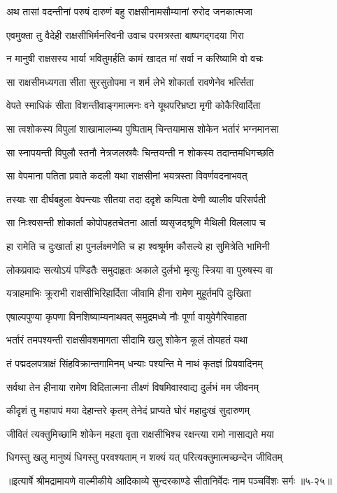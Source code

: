 
\twolineshloka
{अथ तासां वदन्तीनां परुषं दारुणं बहु}
{राक्षसीनामसौम्यानां रुरोद जनकात्मजा} %

\twolineshloka
{एवमुक्ता तु वैदेही राक्षसीभिर्मनस्विनी}
{उवाच परमत्रस्ता बाष्पगद्गदया गिरा} %

\twolineshloka
{न मानुषी राक्षसस्य भार्या भवितुमर्हति}
{कामं खादत मां सर्वा न करिष्यामि वो वचः} %

\twolineshloka
{सा राक्षसीमध्यगता सीता सुरसुतोपमा}
{न शर्म लेभे शोकार्ता रावणेनेव भर्त्सिता} %

\twolineshloka
{वेपते स्माधिकं सीता विशन्तीवाङ्गमात्मनः}
{वने यूथपरिभ्रष्टा मृगी कोकैरिवार्दिता} %

\twolineshloka
{सा त्वशोकस्य विपुलां शाखामालम्ब्य पुष्पिताम्}
{चिन्तयामास शोकेन भर्तारं भग्नमानसा} %

\twolineshloka
{सा स्नापयन्ती विपुलौ स्तनौ नेत्रजलस्रवैः}
{चिन्तयन्ती न शोकस्य तदान्तमधिगच्छति} %

\twolineshloka
{सा वेपमाना पतिता प्रवाते कदली यथा}
{राक्षसीनां भयत्रस्ता विवर्णवदनाभवत्} %

\twolineshloka
{तस्याः सा दीर्घबहुला वेपन्त्याः सीतया तदा}
{ददृशे कम्पिता वेणी व्यालीव परिसर्पती} %

\twolineshloka
{सा निःश्वसन्ती शोकार्ता कोपोपहतचेतना}
{आर्ता व्यसृजदश्रूणि मैथिली विललाप च} %

\twolineshloka
{हा रामेति च दुःखार्ता हा पुनर्लक्ष्मणेति च}
{हा श्वश्रूर्मम कौसल्ये हा सुमित्रेति भामिनी} %

\twolineshloka
{लोकप्रवादः सत्योऽयं पण्डितैः समुदाहृतः}
{अकाले दुर्लभो मृत्युः स्त्रिया वा पुरुषस्य वा} %

\twolineshloka
{यत्राहमाभिः क्रूराभी राक्षसीभिरिहार्दिता}
{जीवामि हीना रामेण मुहूर्तमपि दुःखिता} %

\twolineshloka
{एषाल्पपुण्या कृपणा विनशिष्याम्यनाथवत्}
{समुद्रमध्ये नौः पूर्णा वायुवेगैरिवाहता} %

\twolineshloka
{भर्तारं तमपश्यन्ती राक्षसीवशमागता}
{सीदामि खलु शोकेन कूलं तोयहतं यथा} %

\twolineshloka
{तं पद्मदलपत्राक्षं सिंहविक्रान्तगामिनम्}
{धन्याः पश्यन्ति मे नाथं कृतज्ञं प्रियवादिनम्} %

\twolineshloka
{सर्वथा तेन हीनाया रामेण विदितात्मना}
{तीक्ष्णं विषमिवास्वाद्य दुर्लभं मम जीवनम्} %

\twolineshloka
{कीदृशं तु महापापं मया देहान्तरे कृतम्}
{तेनेदं प्राप्यते घोरं महादुःखं सुदारुणम्} %

\twolineshloka
{जीवितं त्यक्तुमिच्छामि शोकेन महता वृता}
{राक्षसीभिश्च रक्षन्त्या रामो नासाद्यते मया} %

\twolineshloka
{धिगस्तु खलु मानुष्यं धिगस्तु परवश्यताम्}
{न शक्यं यत् परित्यक्तुमात्मच्छन्देन जीवितम्} %


॥इत्यार्षे श्रीमद्रामायणे वाल्मीकीये आदिकाव्ये सुन्दरकाण्डे सीतानिर्वेदः नाम पञ्चविंशः सर्गः ॥५-२५॥
